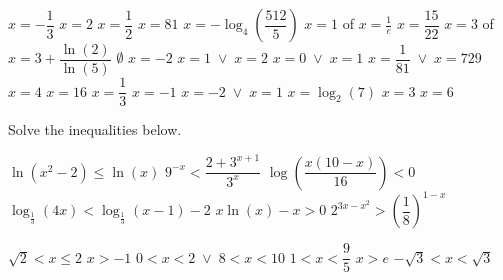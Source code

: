 \begin{Answer}\phantom{}
    \begin{multicols}{2}

        \Question $x= -\dfrac{1}{3}$ 
    	\Question $x=2$ 
    	\Question $x = \dfrac{1}{2}$ 
    	\Question $x = 81$ 
    	\Question $x = - \log_4\left(\dfrac{512}{5} \right)$ 
    	\Question $x = 1$ of $x = \frac{1}{e}$
    	\Question $x = \dfrac{15}{22}$ 
    	\Question $x = 3$ of $x = 3 + \dfrac{\ln (2)}{\ln (5)}$ 
        \Question $\emptyset$  
        \Question $x=-2$ 
        \Question $x= 1 \; \vee \; x=2$ 
        \Question $x=0 \; \vee \; x = 1$ 
        \Question $x=\dfrac{1}{81} \; \vee \; x=729$ 
        \Question $x=4$ 
    	\Question $x=16$
    	\ifanalysis
    	\Question $x= \dfrac{1}{3}$ 
    	\Question $x=-1$ 
    	\Question $x = -2 \; \vee \; x = 1$
    	\Question $x = \log_2 (7)$ 
    	\Question $x=3$ 
    	\Question $x=6$  
    	\fi
    \EndCurrentQuestion	
    \end{multicols}
\end{Answer}

\ifanalysis\pagebreak\fi
\begin{Exercise} Solve the inequalities below.
\begin{multicols}{2}
	\Question[difficulty = 2] $\ln (x^2-2) \leq \ln (x)$ 
	\Question[difficulty = 2] $9^{-x} < \dfrac{2+3^{x+1}}{3^x}$
	\ifanalysis\Question[difficulty = 1]\fi\ifcalculus\Question[difficulty = 2]\fi $ \log \left( \dfrac{x(10-x)}{16} \right) <0 $
	\Question[difficulty = 2] $ \log_{\frac{1}{3}} (4x) < \log_{\frac{1}{3}} (x-1) -2$
	\Question[difficulty = 1] $x \ln(x) - x >0 $
	\Question[difficulty = 1] $2^{3x-x^2} > \left( \dfrac{1}{8} \right)^{1-x}$ 
    \EndCurrentQuestion
\end{multicols}	

\end{Exercise}

\begin{Answer}\phantom{}
    \begin{multicols}{2} 
    
    	\Question $\sqrt{2} < x \leq 2$ 
    	\Question $x>-1$
    	\Question $0<x<2 \; \vee \; 8 < x <10$
    	\Question $ 1 < x < \dfrac{9}{5}$
    	\Question $x>e$
    	\Question $-\sqrt{3} < x < \sqrt{3}$
    \EndCurrentQuestion
    \end{multicols}	
\end{Answer}


